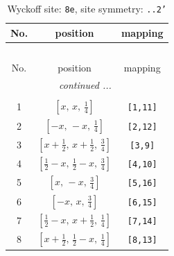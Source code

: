 \documentclass[fleqn,8pt]{jsarticle}
\begin{document}
\renewcommand{\arraystretch}{1.2}
\begin{longtable}{ccc}
\caption{Wyckoff site: {\tt 8e}, site symmetry: {\tt ..2'}}
 \\
 \hline \hline
No. & position & mapping \\ \hline \endfirsthead

\multicolumn{2}{l}{\tablename\ \thetable{}} \\
 \hline \hline
No. & position & mapping \\ \hline \endhead

 \hline \hline
\multicolumn{2}{r}{\footnotesize\it continued ...} \\ \endfoot

 \hline \hline
\multicolumn{2}{r}{} \\ \endlastfoot

1 & $\left[ x,\, x,\, \frac{1}{4} \right]$ & {\tt [1,11]} \\ \hline
2 & $\left[ - x,\, - x,\, \frac{1}{4} \right]$ & {\tt [2,12]} \\ \hline
3 & $\left[ x + \frac{1}{2},\, x + \frac{1}{2},\, \frac{3}{4} \right]$ & {\tt [3,9]} \\ \hline
4 & $\left[ \frac{1}{2} - x,\, \frac{1}{2} - x,\, \frac{3}{4} \right]$ & {\tt [4,10]} \\ \hline
5 & $\left[ x,\, - x,\, \frac{3}{4} \right]$ & {\tt [5,16]} \\ \hline
6 & $\left[ - x,\, x,\, \frac{3}{4} \right]$ & {\tt [6,15]} \\ \hline
7 & $\left[ \frac{1}{2} - x,\, x + \frac{1}{2},\, \frac{1}{4} \right]$ & {\tt [7,14]} \\ \hline
8 & $\left[ x + \frac{1}{2},\, \frac{1}{2} - x,\, \frac{1}{4} \right]$ & {\tt [8,13]} \\
\end{longtable}
\renewcommand{\arraystretch}{1.2}
\end{document}
